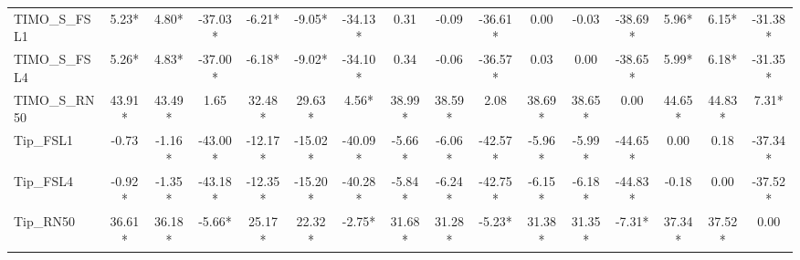 \documentclass[conference,6pt]{IEEEtran}
\begin{document}
\begin{table}[H]
{\begin{tabular}{@{}l*{15}{c}@{}}
TIMO\_S\_FSL1 & 5.23* & 4.80* & -37.03* & -6.21* & -9.05* & -34.13* & 0.31 & -0.09 & -36.61* & 0.00 & -0.03 & -38.69* & 5.96* & 6.15* & -31.38* \\
TIMO\_S\_FSL4 & 5.26* & 4.83* & -37.00* & -6.18* & -9.02* & -34.10* & 0.34 & -0.06 & -36.57* & 0.03 & 0.00 & -38.65* & 5.99* & 6.18* & -31.35* \\
TIMO\_S\_RN50 & 43.91* & 43.49* & 1.65 & 32.48* & 29.63* & 4.56* & 38.99* & 38.59* & 2.08 & 38.69* & 38.65* & 0.00 & 44.65* & 44.83* & 7.31* \\
Tip\_FSL1 & -0.73 & -1.16* & -43.00* & -12.17* & -15.02* & -40.09* & -5.66* & -6.06* & -42.57* & -5.96* & -5.99* & -44.65* & 0.00 & 0.18 & -37.34* \\
Tip\_FSL4 & -0.92* & -1.35* & -43.18* & -12.35* & -15.20* & -40.28* & -5.84* & -6.24* & -42.75* & -6.15* & -6.18* & -44.83* & -0.18 & 0.00 & -37.52* \\
Tip\_RN50 & 36.61* & 36.18* & -5.66* & 25.17* & 22.32* & -2.75* & 31.68* & 31.28* & -5.23* & 31.38* & 31.35* & -7.31* & 37.34* & 37.52* & 0.00 \\
\bottomrule
\end{tabular}%
}
\end{table}

\FloatBarrier
\end{document}
